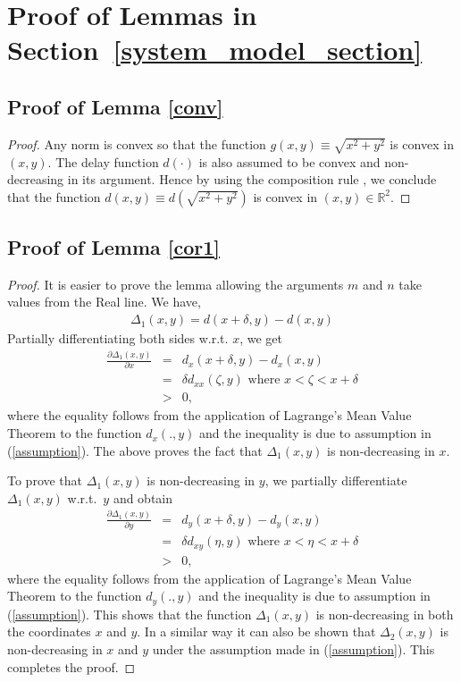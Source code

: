 \documentclass[conference]{IEEEtran}
\begin{document}



\clearpage
\appendices

\section{Proof of Lemmas in Section~\ref{system_model_section}}
\subsection{Proof of Lemma \ref{conv}}
\label{conv_appendix}
\begin{proof}
Any norm is convex so that the function $g(x,y)\equiv \sqrt{x^2+y^2}$ is convex 
in $(x,y)$. The delay function $d(\cdot)$ is also assumed to be convex and non-decreasing in its argument. Hence by using the composition rule 
\cite[Section~3.2.4]{Boyd}, we conclude that the function $d(x,y)\equiv d(\sqrt{x^2+y^2})$ is convex in $(x,y)\in \mathbb{R}^2$. 
\end{proof}

\subsection{Proof of Lemma \ref{cor1}}
\label{cor1_appendix}
\begin{proof}
It is easier to prove the lemma allowing the arguments $m$ and $n$ take values from the Real line. 
We have,
\begin{eqnarray*}
\Delta_1(x,y)=d(x+\delta,y)-d(x,y)
\end{eqnarray*}
Partially differentiating both sides w.r.t. $x$, we get
\begin{eqnarray*}
\frac{\partial\Delta_1(x,y)}{\partial x}&=& d_x(x+\delta,y)-d_x(x,y)\\
&=&\delta d_{xx}(\zeta,y) \mbox{ where } x<\zeta<x+\delta\label{LMVT1}\\
&>&0, \label{positivity}
\end{eqnarray*}
where the equality follows from the application of Lagrange's Mean Value Theorem to the function $d_x(.,y)$ and the inequality is due to assumption in (\ref{assumption}).
The above proves the fact that $\Delta_1(x,y)$ is non-decreasing in $x$. 

To prove that $\Delta_1(x,y)$ is non-decreasing in $y$, we partially differentiate $\Delta_1(x,y)$ 
w.r.t.\ $y$ and obtain
\begin{eqnarray*}
\frac{\partial\Delta_1(x,y)}{\partial y}&=&d_y(x+\delta,y)-d_y(x,y)\\
&=&\delta d_{xy}(\eta,y) \mbox{ where } x<\eta<x+\delta\label{LMVT2}\\
&>&0, \label{pos2}
\end{eqnarray*} 
where the equality  follows from the application of Lagrange's Mean Value Theorem to the function $d_y(.,y)$ and the inequality is due to assumption in (\ref{assumption}).
This shows that the function $\Delta_1(x,y)$ is non-decreasing in both the coordinates $x$ and $y$. In a similar way it can also be shown that $\Delta_2(x,y)$ is non-decreasing in $x$ and $y$ under the assumption made in (\ref{assumption}). This completes the proof.
\end{proof}
\end{document}
